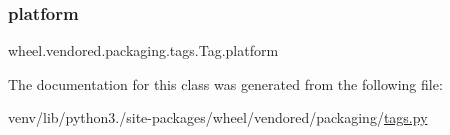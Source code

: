 \mbox{\label{classwheel_1_1vendored_1_1packaging_1_1tags_1_1Tag_af7661fca260f01350e47c6de1c1c7063}} 
\subsubsection{\texorpdfstring{platform}{platform}}
{\footnotesize\ttfamily wheel.\+vendored.\+packaging.\+tags.\+Tag.\+platform}



The documentation for this class was generated from the following file\+:\begin{DoxyCompactItemize}
\item 
venv/lib/python3./site-\/packages/wheel/vendored/packaging/\hyperlink{wheel_2vendored_2packaging_2tags_8py}{tags.\+py}\end{DoxyCompactItemize}
